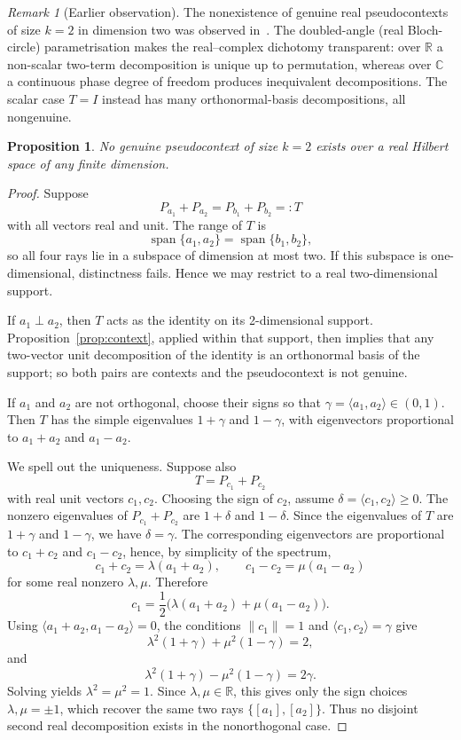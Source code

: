 \documentclass[
  twocolumn,
  aps,
  pra,
  floatfix,
  amsmath,amssymb,
  longbibliography
]{revtex4-2}
\newtheorem{proposition}[theorem]{Proposition}
\theoremstyle{definition}
\theoremstyle{remark}
\newtheorem{remark}[theorem]{Remark}
\begin{document}
\begin{remark}[Earlier observation]\label{rem:realvscomplex}
The nonexistence of genuine real pseudocontexts of size $k=2$ in
dimension two was observed in~\cite{NSvozil:QS24}.  The doubled-angle
(real Bloch-circle) parametrisation makes the real--complex dichotomy
transparent: over $\mathbb{R}$ a non-scalar two-term decomposition is
unique up to permutation, whereas over $\mathbb{C}$ a continuous phase
degree of freedom produces inequivalent decompositions.  The scalar case
$T=I$ instead has many orthonormal-basis decompositions, all nongenuine.
\end{remark}

\begin{proposition}\label{prop:no_real_k2_anyn}
No genuine pseudocontext of size \(k=2\) exists over a real Hilbert space
of any finite dimension.
\end{proposition}

\begin{proof}
Suppose
\[
P_{a_1}+P_{a_2}=P_{b_1}+P_{b_2}=:T
\]
with all vectors real and unit. The range of \(T\) is
\[
\operatorname{span}\{a_1,a_2\}=\operatorname{span}\{b_1,b_2\},
\]
so all four rays lie in a subspace of dimension at most two. If this
subspace is one-dimensional, distinctness fails. Hence we may restrict to
a real two-dimensional support.

If \(a_1\perp a_2\), then \(T\) acts as the identity on its
2-dimensional support. Proposition~\ref{prop:context}, applied within
that support, then implies that any two-vector unit decomposition of the
identity is an orthonormal basis of the support; so both pairs are
contexts and the pseudocontext is not genuine.

If \(a_1\) and \(a_2\) are not orthogonal, choose their signs so that
\(\gamma=\langle a_1,a_2\rangle\in(0,1)\). Then \(T\) has the simple
eigenvalues \(1+\gamma\) and \(1-\gamma\), with eigenvectors proportional
to \(a_1+a_2\) and \(a_1-a_2\).

We spell out the uniqueness. Suppose also
\[
T=P_{c_1}+P_{c_2}
\]
with real unit vectors \(c_1,c_2\). Choosing the sign of \(c_2\), assume
\(\delta=\langle c_1,c_2\rangle\ge 0\). The nonzero eigenvalues of
\(P_{c_1}+P_{c_2}\) are \(1+\delta\) and \(1-\delta\). Since the eigenvalues of
\(T\) are \(1+\gamma\) and \(1-\gamma\), we have \(\delta=\gamma\). The corresponding eigenvectors are proportional to \(c_1+c_2\) and \(c_1-c_2\), hence, by simplicity of the spectrum,
\[
c_1+c_2=\lambda(a_1+a_2),\qquad
c_1-c_2=\mu(a_1-a_2)
\]
for some real nonzero \(\lambda,\mu\). Therefore
\[
c_1=\frac12\bigl(\lambda(a_1+a_2)+\mu(a_1-a_2)\bigr).
\]
Using \(\langle a_1+a_2,a_1-a_2\rangle=0\), the conditions
\(\|c_1\|=1\) and \(\langle c_1,c_2\rangle=\gamma\) give
\[
\lambda^2(1+\gamma)+\mu^2(1-\gamma)=2,
\]
and
\[
\lambda^2(1+\gamma)-\mu^2(1-\gamma)=2\gamma.
\]
Solving yields \(\lambda^2=\mu^2=1\). Since \(\lambda,\mu\in\mathbb R\), this gives only the sign choices \(\lambda,\mu=\pm1\), which recover the same two rays \(\{[a_1],[a_2]\}\). Thus no disjoint second real decomposition exists in the nonorthogonal case.
\end{proof}
\end{document}

